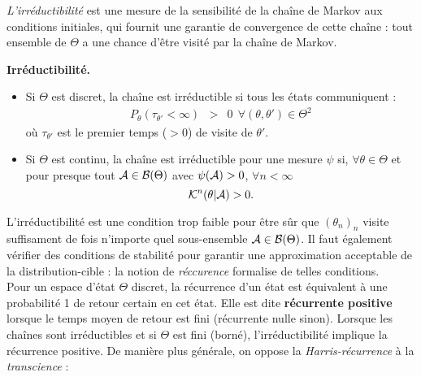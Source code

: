 \emph{L'irréductibilité} est une mesure de la sensibilité de la chaîne de Markov aux conditions initiales, qui fournit une garantie de convergence de cette chaîne : tout ensemble de $\Theta$ a une chance d'être visité par la chaîne de Markov.

\begin{proposition}{\bf Irréductibilité.}
\begin{itemize}
\item Si $\Theta$ est discret, la chaîne est irréductible si tous les états communiquent :
\begin{eqnarray*}
P_{\theta}\left(\tau_{\theta'} < \infty\right) & > & 0  \ \ \forall (\theta,\theta')\in\Theta^2
\end{eqnarray*}
où $\tau_{\theta'}$ est le premier temps ($>0$) de visite de $\theta'$.
\item Si $\Theta$ est continu, la chaîne est irréductible pour une mesure $\psi$ si, $\forall \theta\in\Theta$ et pour presque tout ${\cal{A}}\in{\cal{B}}(\Theta)$ avec $\psi({\cal{A}})>0$, $\forall n<\infty$
$$
 {\cal{K}}^n(\theta|{\cal{A}})  >  0.
$$
\end{itemize}
\end{proposition}


L'irréductibilité est une condition trop faible pour être sûr que $(\theta_n)_n$ visite suffisament de fois n'importe quel sous-ensemble ${\cal{A}}\in {\cal{B}}(\Theta)$. Il faut également vérifier des conditions de stabilité pour garantir une approximation acceptable de la distribution-cible : la notion de \emph{réccurence} formalise de telles conditions. \\

Pour un espace d'état $\Theta$ discret, la récurrence d'un état est équivalent à une probabilité 1 de retour certain en cet état. Elle est dite {\bf récurrente positive} lorsque le temps moyen de retour est fini (récurrente nulle sinon).  Lorsque les chaînes sont irréductibles et si $\Theta$ est fini (borné), l'irréductibilité implique la récurrence positive. De manière plus générale, on oppose la \emph{Harris-récurrence} à la \emph{transcience} : 

